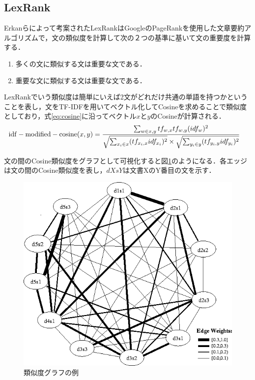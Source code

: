 \subsection{LexRank}
Erkanら\cite{lexRank}によって考案されたLexRankはGoogleのPageRank\cite{pageRank1999}を使用した文章要約アルゴリズムで，文の類似度を計算して次の２つの基準に基いて文の重要度を計算する．
\begin{enumerate}
  \item 多くの文に類似する文は重要な文である．
  \item 重要な文に類似する文は重要な文である．
\end{enumerate}
LexRankでいう類似度は簡単にいえば2文がどれだけ共通の単語を持つかということを表し，文をTF-IDFを用いてベクトル化してCosineを求めることで類似度としており，式\ref{eq:cosine}に沿ってベクトル$x$と$y$のCosineが計算される．
\begin{equation}
\begin{aligned}
\label{eq:cosine}
{\rm idf-modified-cosine}(x,y) & = \frac{\sum_{w \in x,y} tf_{w,x} tf_{w,y} (idf_w)^2} {\sqrt{ \sum_{x_i \in x} ( tf_{x_i,x} idf_{x_i} )^2  } \times \sqrt{ \sum_{y_i \in y} ( tf_{y_i,y} idf_{y_i} )^2  }}
\end{aligned}
\end{equation}

文の間のCosine類似度をグラフとして可視化すると図\ref{Fig:lexGraph1}のようになる．各エッジは文の間のCosine類似度を表し，$dXsY$は文書XのY番目の文を示す．
\begin{figure}[htbp]
 \begin{center}
  \includegraphics[width=\textwidth]{../images/2.Related_Work/lexRank-graph.png}
  \caption{類似度グラフの例}
  \label{Fig:lexGraph1}
  \vspace{-10pt}
 \end{center}
\end{figure}

